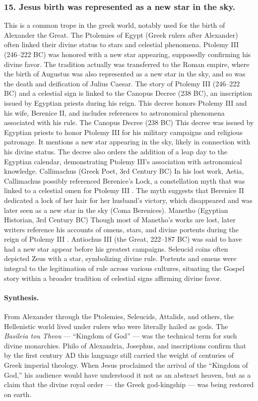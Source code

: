\subsubsection{15.
Jesus birth was represented as a new star in the sky.}\label{subsubsec:jesus-birth-was-represented-as-a-new-star-in-the-sky.}
This is a common trope in the greek world, notably used for the birth of Alexander the Great.
The Ptolemies of Egypt (Greek rulers after Alexander) often linked their divine status to stars and celestial phenomena.
Ptolemy III (246–222 BC) was honored with a new star appearing, supposedly confirming his divine favor.
The tradition actually was transferred to the Roman empire, where the birth of Augustus was also represented as a new star in the sky, and so was the death and deification of Julius Caesar.
The story of Ptolemy III (246–222 BC) and a celestial sign is linked to the Canopus Decree (238 BC), an inscription issued by Egyptian priests during his reign.
This decree honors Ptolemy III and his wife, Berenice II, and includes references to astronomical phenomena associated with his rule.
The Canopus Decree (238 BC) This decree was issued by Egyptian priests to honor Ptolemy III for his military campaigns and religious patronage.
It mentions a new star appearing in the sky, likely in connection with his divine status.
The decree also orders the addition of a leap day to the Egyptian calendar, demonstrating Ptolemy III’s association with astronomical knowledge.
Callimachus (Greek Poet, 3rd Century BC) In his lost work, Aetia, Callimachus possibly referenced Berenice’s Lock, a constellation myth that was linked to a celestial omen for Ptolemy III .
The myth suggests that Berenice II dedicated a lock of her hair for her husband’s victory, which disappeared and was later seen as a new star in the sky (Coma Berenices).
Manetho (Egyptian Historian, 3rd Century BC) Though most of Manetho’s works are lost, later writers reference his accounts of omens, stars, and divine portents during the reign of Ptolemy III .
Antiochus III (the Great, 222–187 BC) was said to have had a new star appear before his greatest campaigns.
Seleucid coins often depicted Zeus with a star, symbolizing divine rule.
Portents and omens were integral to the legitimation of rule across various cultures, situating the Gospel story within a broader tradition of celestial signs affirming divine favor.

\paragraph{Synthesis.}
From Alexander through the Ptolemies, Seleucids, Attalids, and others, the Hellenistic world lived under rulers who were literally hailed as gods.
The \textit{Basileia tou Theou} — “Kingdom of God” — was the technical term for such divine monarchies.
Philo of Alexandria, Josephus, and inscriptions confirm that by the first century AD this language still carried the weight of centuries of Greek imperial theology.
When Jesus proclaimed the arrival of the “Kingdom of God,” his audience would have understood it not as an abstract heaven, but as a claim that the divine royal order — the Greek god-kingship — was being restored on earth.

